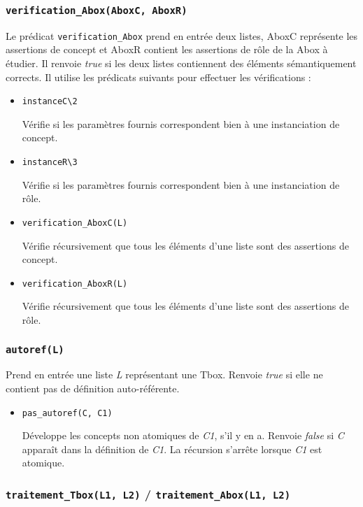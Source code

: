 \documentclass{article}
\newcommand{\code}[1]{\colorbox{light-gray}{\texttt{#1}}}
\begin{document}
\subsubsection{\code{verification\_Abox(AboxC, AboxR)}}
Le prédicat \code{verification\_Abox} prend en entrée deux listes, AboxC représente les assertions de concept et AboxR contient les assertions de rôle de la Abox à étudier. Il renvoie \textit{true} si les deux listes contiennent des éléments sémantiquement corrects. Il utilise les prédicats suivants pour effectuer les vérifications :
\begin{itemize}
    \item \code{instanceC\textbackslash2}

    Vérifie si les paramètres fournis correspondent bien à une instanciation de concept.

    \item \code{instanceR\textbackslash3}

    Vérifie si les paramètres fournis correspondent bien à une instanciation de rôle.

    \item \code{verification\_AboxC(L)}

    Vérifie récursivement que tous les éléments d'une liste sont des assertions de concept.

    \item \code{verification\_AboxR(L)}
    
    Vérifie récursivement que tous les éléments d'une liste sont des assertions de rôle.
\end{itemize}

\subsubsection{\code{autoref(L)}}
Prend en entrée une liste \textit{L} représentant une Tbox. Renvoie \textit{true} si elle ne contient pas de définition auto-référente.

\begin{itemize}

    \item \code{pas\_autoref(C, C1)}

    Développe les concepts non atomiques de \textit{C1}, s'il y en a. Renvoie \textit{false} si \textit{C} apparaît dans la définition de \textit{C1}. La récursion s'arrête lorsque \textit{C1} est atomique.
\end{itemize}

\subsubsection{\code{traitement\_Tbox(L1, L2)} / \code{traitement\_Abox(L1, L2)}}
\end{document}
